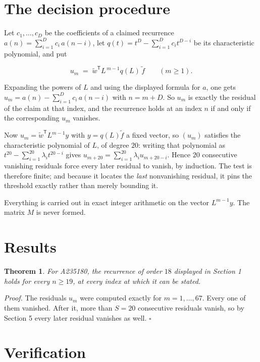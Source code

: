 \documentclass[11pt]{article}
\newtheorem{theorem}{Theorem}
\theoremstyle{definition}
\begin{document}
\section{The decision procedure}

Let $c_1,\dots,c_D$ be the coefficients of a claimed recurrence $a(n) = \sum_{i=1}^{D} c_i\,a(n-i)$, let $q(t) = t^{D} - \sum_{i=1}^{D} c_i t^{D-i}$ be its characteristic polynomial, and put

\[u_m \;=\; \tilde w^{\mathsf T} L^{\,m-1} q(L)\,\tilde f \qquad (m \ge 1).\]

Expanding the powers of $L$ and using the displayed formula for $a$, one gets $u_m = a(n) - \sum_{i=1}^{D} c_i\,a(n-i)$ with $n = m + D$. So $u_m$ is exactly the residual of the claim at that index, and the recurrence holds at an index $n$ if and only if the corresponding $u_m$ vanishes.

Now $u_m = \tilde w^{\mathsf T} L^{m-1} y$ with $y = q(L)\tilde f$ a fixed vector, so $(u_m)$ satisfies the characteristic polynomial of $L$, of degree $20$: writing that polynomial as $t^{20} - \sum_{i=1}^{20} \lambda_i t^{20-i}$ gives $u_{m+20} = \sum_{i=1}^{20} \lambda_i u_{m+20-i}$. Hence $20$ consecutive vanishing residuals force every later residual to vanish, by induction. The test is therefore finite; and because it locates the {\itshape last} nonvanishing residual, it pins the threshold exactly rather than merely bounding it.

Everything is carried out in exact integer arithmetic on the vector $L^{m-1}y$. The matrix $M$ is never formed.

\section{Results}

\begin{theorem} For A235180, the recurrence of order $18$ displayed in Section 1 holds for every $n \ge 19$, at every index at which it can be stated.\end{theorem}

{\itshape Proof.} The residuals $u_m$ were computed exactly for $m = 1,\dots,67$. Every one of them vanished. After it, more than $S = 20$ consecutive residuals vanish, so by Section 5 every later residual vanishes as well. $\square$

\section{Verification}
\end{document}
